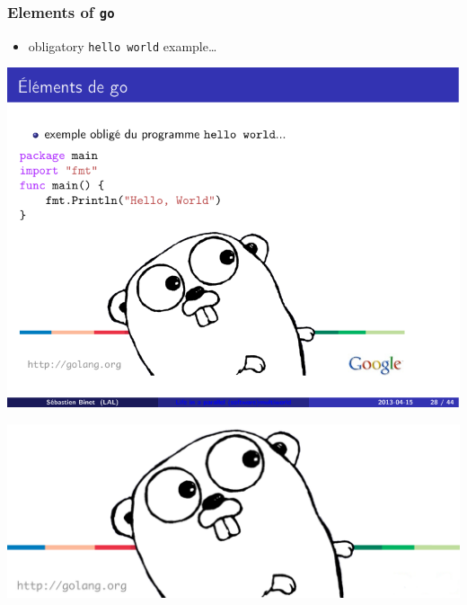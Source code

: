 \documentclass[9pt]{beamer}
\begin{document}
\begin{frame}[fragile]
\frametitle{Elements of \verb~go~}


\begin{itemize}
\item obligatory \verb~hello world~ example\ldots{}
\end{itemize}

\begin{block}{}
\begin{center}
  \includegraphics[width=.5\linewidth]{figs/go-hello-world.pdf}
\end{center}
\end{block}


\includegraphics[width=.95\linewidth]{figs/golang-logo.png}

\end{frame}
\end{document}
